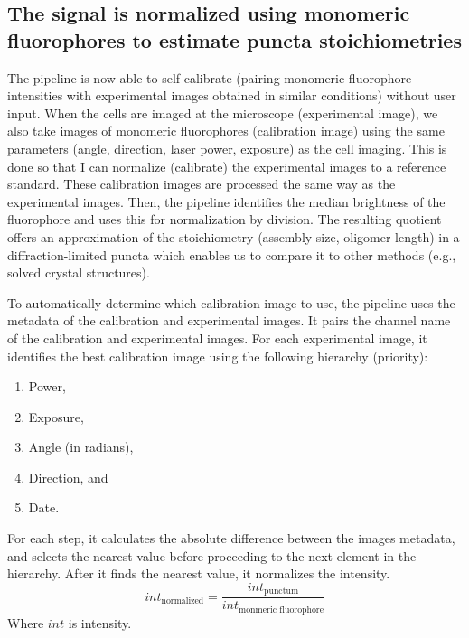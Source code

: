 \subsection{The signal is normalized using monomeric fluorophores to estimate puncta stoichiometries}
The pipeline is now able to self-calibrate (pairing monomeric fluorophore intensities with experimental images obtained in similar conditions) without user input. When the cells are imaged at the microscope (experimental image), we also take images of monomeric fluorophores (calibration image) using the same parameters (angle, direction, laser power, exposure) as the cell imaging. This is done so that I can normalize (calibrate) the experimental images to a reference standard. These calibration images are processed the same way as the experimental images. Then, the pipeline identifies the median brightness of the fluorophore and uses this for normalization by division. The resulting quotient offers an approximation of the stoichiometry (assembly size, oligomer length) in a diffraction-limited puncta which enables us to compare it to other methods (e.g., solved crystal structures).

To automatically determine which calibration image to use, the pipeline uses the metadata of the calibration and experimental images. It pairs the channel name of the calibration and experimental images. For each experimental image, it identifies the best calibration image using the following hierarchy (priority):
\begin{enumerate}
\item Power,
\item Exposure,
\item Angle (in radians),
\item Direction, and
\item Date.
\end{enumerate}
For each step, it calculates the absolute difference between the images metadata, and selects the nearest value before proceeding to the next element in the hierarchy. After it finds the nearest value, it normalizes the intensity. \begin{equation}int_{\text{normalized}} = \frac{int_{\text{punctum}}}{int_{\text{monmeric fluorophore}}}\end{equation}
Where $int$ is intensity.
